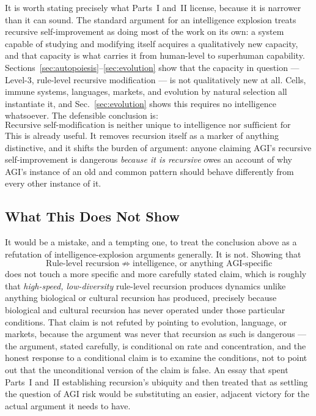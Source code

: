 \documentclass[11pt,a4paper]{article}
\theoremstyle{plain}
\theoremstyle{definition}
\theoremstyle{remark}
\begin{document}
It is worth stating precisely what Parts~I and~II license, because it is narrower than it can sound. The standard argument for an intelligence explosion treats recursive self-improvement as doing most of the work on its own: a system capable of studying and modifying itself acquires a qualitatively new capacity, and that capacity is what carries it from human-level to superhuman capability. Sections~\ref{sec:autopoiesis}--\ref{sec:evolution} show that the capacity in question — Level-3, rule-level recursive modification — is not qualitatively new at all. Cells, immune systems, languages, markets, and evolution by natural selection all instantiate it, and Sec.~\ref{sec:evolution} shows this requires no intelligence whatsoever. The defensible conclusion is:
\[
\text{Recursive self-modification is neither unique to intelligence nor sufficient for intelligence.}
\]
This is already useful. It removes recursion itself as a marker of anything distinctive, and it shifts the burden of argument: anyone claiming AGI's recursive self-improvement is dangerous \emph{because it is recursive} owes an account of why AGI's instance of an old and common pattern should behave differently from every other instance of it.

\subsection{What This Does Not Show}
\label{subsec:overstatement-risk}

It would be a mistake, and a tempting one, to treat the conclusion above as a refutation of intelligence-explosion arguments generally. It is not. Showing that
\[
\text{Rule-level recursion} \;\not\Rightarrow\; \text{intelligence, or anything AGI-specific}
\]
does not touch a more specific and more carefully stated claim, which is roughly that \emph{high-speed, low-diversity} rule-level recursion produces dynamics unlike anything biological or cultural recursion has produced, precisely because biological and cultural recursion has never operated under those particular conditions. That claim is not refuted by pointing to evolution, language, or markets, because the argument was never that recursion as such is dangerous — the argument, stated carefully, is conditional on rate and concentration, and the honest response to a conditional claim is to examine the conditions, not to point out that the unconditional version of the claim is false. An essay that spent Parts~I and~II establishing recursion's ubiquity and then treated that as settling the question of AGI risk would be substituting an easier, adjacent victory for the actual argument it needs to have.
\end{document}
